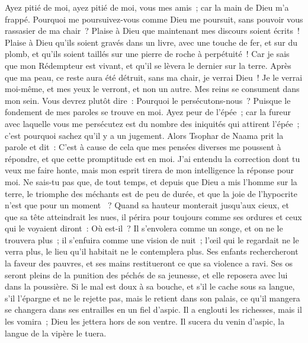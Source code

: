 \begin{multicols}{2}
Ayez pitié de moi, ayez pitié de moi, vous mes amis~; car la main de Dieu m'a frappé.
Pourquoi me poursuivez-vous comme Dieu me poursuit, sans pouvoir vous rassasier de ma chair~?
Plaise à Dieu que maintenant mes discours soient écrits~! Plaise à Dieu qu'ils soient gravés dans un livre, 
avec une touche de fer, et sur du plomb, et qu'ils soient taillés sur une pierre de roche à perpétuité~!
Car je sais que mon Rédempteur est vivant, et qu'il se lèvera le dernier sur la terre.
Après que ma peau, ce reste aura été détruit, sans ma chair, je verrai Dieu~!
Je le verrai moi-même, et mes yeux le verront, et non un autre. Mes reins se consument dans mon sein. 
Vous devrez plutôt dire~: Pourquoi le persécutons-nous~? Puisque le fondement de mes paroles se trouve en moi.
Ayez peur de l'épée~; car la fureur avec laquelle vous me persécutez est du nombre des iniquités qui attirent l'épée~; c'est pourquoi sachez qu'il y a un jugement.
\VerseOne{}Alors Tsophar de Naama prit la parole et dit~:
C'est à cause de cela que mes pensées diverses me poussent à répondre, et que cette promptitude est en moi. 
J'ai entendu la correction dont tu veux me faire honte, mais mon esprit tirera de mon intelligence la réponse pour moi. 
Ne sais-tu pas que, de tout temps, et depuis que Dieu a mis l'homme sur la terre, 
le triomphe des méchants est de peu de durée, et que la joie de l'hypocrite n'est que pour un moment ~?
Quand sa hauteur monterait jusqu'aux cieux, et que sa tête atteindrait les nues,
il périra pour toujours comme ses ordures et ceux qui le voyaient diront~: Où est-il~?
Il s'envolera comme un songe, et on ne le trouvera plus~; il s'enfuira comme une vision de nuit~;
l'œil qui le regardait ne le verra plus, le lieu qu'il habitait ne le contemplera plus.
Ses enfants rechercheront la faveur des pauvres, et ses mains restitueront ce que sa violence a ravi.
Ses os seront pleins de la punition des péchés de sa jeunesse, et elle reposera avec lui dans la poussière.
Si le mal est doux à sa bouche, et s'il le cache sous sa langue,
s'il l'épargne et ne le rejette pas, mais le retient dans son palais, 
ce qu'il mangera se changera dans ses entrailles en un fiel d'aspic.
Il a englouti les richesses, mais il les vomira~; Dieu les jettera hors de son ventre.
Il sucera du venin d'aspic, la langue de la vipère le tuera.

\end{multicols}
